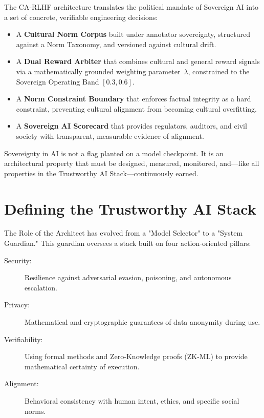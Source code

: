 The CA-RLHF architecture translates the political mandate of
Sovereign AI into a set of concrete, verifiable engineering
decisions:

\begin{itemize}
  \item A \textbf{Cultural Norm Corpus} built under annotator
    sovereignty, structured against a Norm Taxonomy, and versioned
    against cultural drift.
  \item A \textbf{Dual Reward Arbiter} that combines cultural and
    general reward signals via a mathematically grounded weighting
    parameter~$\lambda$, constrained to the Sovereign Operating Band
    $[0.3, 0.6]$.
  \item A \textbf{Norm Constraint Boundary} that enforces factual
    integrity as a hard constraint, preventing cultural alignment from
    becoming cultural overfitting.
  \item A \textbf{Sovereign AI Scorecard} that provides regulators,
    auditors, and civil society with transparent, measurable evidence
    of alignment.
\end{itemize}

Sovereignty in AI is not a flag planted on a model checkpoint.
It is an architectural property that must be designed, measured,
monitored, and---like all properties in the Trustworthy AI
Stack---continuously earned.

\section{Defining the Trustworthy AI Stack}
\label{sec:defining_stack}

The Role of the Architect has evolved from a "Model Selector" to a "System Guardian." This guardian oversees a stack built on four action-oriented pillars:

\begin{description}
  \item[Security:] Resilience against adversarial evasion, poisoning, and autonomous escalation.
  \item[Privacy:] Mathematical and cryptographic guarantees of data anonymity during use.
  \item[Verifiability:] Using formal methods and Zero-Knowledge proofs (ZK-ML) to provide mathematical certainty of execution.
  \item[Alignment:] Behavioral consistency with human intent, ethics, and specific social norms.
\end{description}

